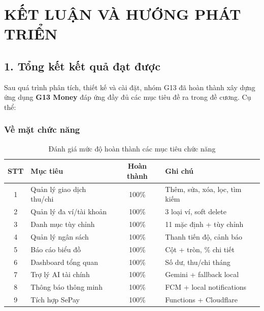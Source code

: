 \chapter*{KẾT LUẬN VÀ HƯỚNG PHÁT TRIỂN}

\section*{1. Tổng kết kết quả đạt được}

Sau quá trình phân tích, thiết kế và cài đặt, nhóm G13 đã hoàn thành xây dựng ứng dụng \textbf{G13 Money} đáp ứng đầy đủ các mục tiêu đề ra trong đề cương. Cụ thể:

\subsection*{Về mặt chức năng}

\begin{table}[H]
\centering
\caption{Đánh giá mức độ hoàn thành các mục tiêu chức năng}
\begin{tabularx}{\textwidth}{|c|X|c|X|}
\hline
\textbf{STT} & \textbf{Mục tiêu} & \textbf{Hoàn thành} & \textbf{Ghi chú} \\
\hline
1 & Quản lý giao dịch thu/chi & 100\% & Thêm, sửa, xóa, lọc, tìm kiếm \\
\hline
2 & Quản lý đa ví/tài khoản & 100\% & 3 loại ví, soft delete \\
\hline
3 & Danh mục tùy chỉnh & 100\% & 11 mặc định + tùy chỉnh \\
\hline
4 & Quản lý ngân sách & 100\% & Thanh tiến độ, cảnh báo \\
\hline
5 & Báo cáo biểu đồ & 100\% & Cột + tròn, \% chi tiết \\
\hline
6 & Dashboard tổng quan & 100\% & Số dư, thu/chi tháng \\
\hline
7 & Trợ lý AI tài chính & 100\% & Gemini + fallback local \\
\hline
8 & Thông báo thông minh & 100\% & FCM + local notifications \\
\hline
9 & Tích hợp SePay & 100\% & Functions + Cloudflare \\
\hline
\end{tabularx}
\end{table}

